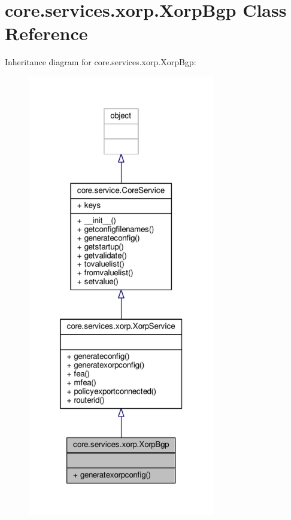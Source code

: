 \hypertarget{classcore_1_1services_1_1xorp_1_1_xorp_bgp}{\section{core.\+services.\+xorp.\+Xorp\+Bgp Class Reference}
\label{classcore_1_1services_1_1xorp_1_1_xorp_bgp}
}


Inheritance diagram for core.\+services.\+xorp.\+Xorp\+Bgp\+:
\nopagebreak
\begin{figure}[H]
\begin{center}
\leavevmode
\includegraphics[height=550pt]{classcore_1_1services_1_1xorp_1_1_xorp_bgp__inherit__graph}
\end{center}
\end{figure}


